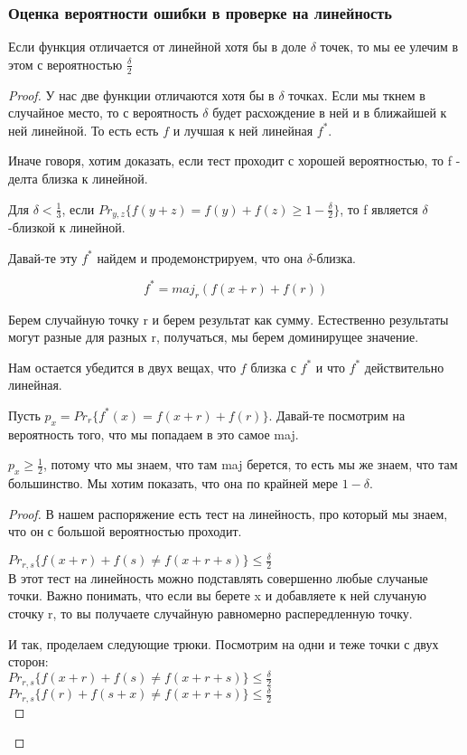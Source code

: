 \subsubsection{Оценка вероятности ошибки в проверке на линейность}
\begin{lemma}
	Если функция отличается от линейной хотя бы в доле $\delta$ точек, 
	то мы ее улечим в этом с вероятностью $\frac{\delta}{2}$
\end{lemma}
\begin{proof}
	У нас две функции отличаются хотя бы в $\delta$ точках. 
	Если мы ткнем в случайное место, то с вероятность $\delta$ будет расхождение в ней и 
	в ближайшей к ней линейной. То есть есть $f$ и лучшая к ней линейная $f^*$. 

	Иначе говоря, хотим доказать, если тест проходит с хорошей вероятностью, 
	то f - делта близка к линейной. 
	
	Для $\delta < \frac{1}{3}$, если $Pr_{y, z}\{f(y + z) = f(y) + f(z) \ge 1 - \frac{\delta}{2}\}$,
	то f является $\delta$-близкой к линейной.

	Давай-те эту $f^*$ найдем и продемонстрируем, что она $\delta$-близка.

	$$f^* = maj_{r}(f(x + r) + f(r))$$	

	Берем случайную точку r и берем результат как сумму. Естественно
	результаты могут разные для разных r, получаться, мы берем
	доминирущее значение. 	

	Нам остается убедится в двух вещах, что $f$ близка с $f^*$ и что 
	$f^*$ действительно линейная.

	Пусть $p_x = Pr_{r}\{f^*(x) = f(x + r) + f(r)\}$. Давай-те посмотрим на 
	вероятность того, что мы попадаем в это самое maj. 

	$p_x \ge \frac{1}{2}$, потому что мы знаем, что там maj берется, 
	то есть мы же знаем, что там большинство. Мы хотим показать,
	что она по крайней мере $1 - \delta$. 

	\begin{proof}
		В нашем распоряжение есть тест на линейность, про который 
		мы знаем, что он с большой вероятностью проходит.

		$Pr_{r, s}\{f(x + r) + f(s) \ne f(x + r + s)\} \le \frac{\delta}{2}$\\
		В этот тест на линейность можно подставлять совершенно любые случаные точки.
		Важно понимать, что если вы берете x и добавляете к ней случаную
		сточку r, то вы получаете случайную равномерно распередленную точку.

		И так, проделаем следующие трюки. Посмотрим на одни и теже точки с двух сторон:\\
		$Pr_{r, s}\{f(x + r) + f(s) \ne f(x + r + s)\} \le \frac{\delta}{2}$\\
		$Pr_{r, s}\{f(r) + f(s + x) \ne f(x + r + s)\} \le \frac{\delta}{2}$\\


\end{proof}
\end{proof}
